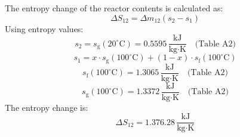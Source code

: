 The entropy change of the reactor contents is calculated as:  
\[
\Delta S_{12} = \Delta m_{12} \left( s_{2} - s_{1} \right)
\]  
Using entropy values:  
\[
s_{2} = s_{\text{g}}(20^\circ\text{C}) = 0.5595 \, \frac{\text{kJ}}{\text{kg·K}} \quad \text{(Table A2)}
\]  
\[
s_{1} = x \cdot s_{\text{g}}(100^\circ\text{C}) + (1-x) \cdot s_{\text{f}}(100^\circ\text{C})
\]  
\[
s_{\text{f}}(100^\circ\text{C}) = 1.3065 \, \frac{\text{kJ}}{\text{kg·K}} \quad \text{(Table A2)}
\]  
\[
s_{\text{g}}(100^\circ\text{C}) = 1.3372 \, \frac{\text{kJ}}{\text{kg·K}} \quad \text{(Table A2)}
\]  
The entropy change is:  
\[
\Delta S_{12} = 1.376.28 \, \frac{\text{kJ}}{\text{kg·K}}
\]